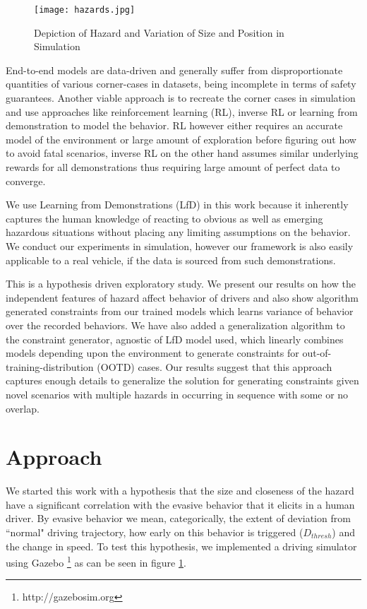 \documentclass{article}
\begin{document}
\begin{figure}[h]
  \centering
  \texttt{[image: hazards.jpg]}
  \caption{Depiction of Hazard and Variation of Size and Position in Simulation}
  \label{fig:hazards}
\end{figure}

End-to-end models \cite{bojarski2016end,chen2015deepdriving} are data-driven and generally suffer from disproportionate 
quantities of various corner-cases in datasets, being incomplete in terms of 
safety guarantees. Another viable approach is to recreate the corner cases in 
simulation and use approaches like reinforcement learning (RL), inverse RL or 
learning from demonstration to model the behavior. RL however either requires
an accurate model of the environment\cite{zhang2016learning} or large 
amount of exploration\cite{isele2017navigating} before figuring out how to 
avoid fatal scenarios, inverse 
RL on the other hand assumes similar underlying rewards for all demonstrations 
thus requiring large amount of perfect data to converge\cite{ziebart2008maximum}.

We use Learning from Demonstrations (LfD)\cite{argall2009survey,atkeson1997robot,akgun2012keyframe} in this work because it inherently 
captures the human knowledge of reacting to obvious as well as emerging 
hazardous situations without placing any limiting assumptions on the behavior. 
We conduct our experiments in simulation, however our framework is also easily 
applicable to a real vehicle, if the data is sourced from such demonstrations.

This is a hypothesis driven exploratory study. We present our results on how
the independent features of hazard affect behavior of drivers and also show
algorithm generated constraints from our trained models which learns variance of behavior
over the recorded behaviors. We have also added a generalization algorithm 
to the constraint generator, agnostic of LfD model used, which linearly combines 
models depending upon the environment to generate constraints for out-of-training-distribution (OOTD)
cases. Our results suggest that this approach captures enough 
details to generalize the solution for generating constraints given 
novel scenarios with multiple hazards in occurring in sequence with some or no overlap.

\section{Approach}
We started this work with a hypothesis that the size and closeness 
of the hazard have a significant correlation with the evasive 
behavior that it elicits in a human driver. By evasive behavior we mean, 
categorically, the extent of deviation from ``normal" driving trajectory, 
how early on this behavior is triggered ($D_{thresh}$) and the change in speed. To 
test this hypothesis, we implemented a driving simulator using Gazebo 
\footnote{http://gazebosim.org} as can be seen in figure \ref{fig:hazards}.
\end{document}
